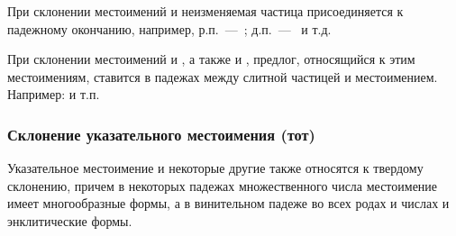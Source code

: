 \documentclass[11pt,a4paper,oneside]{memoir}
\begin{document}
    При склонении местоимений {} и {} неизменяемая частица {} присоединяется к падежному окончанию, например, р.п.~---~{}; д.п.~---~{} и т.д.
    
    При склонении местоимений {} и {}, а также {} и {}, предлог, относящийся к этим местоимениям, ставится в падежах между слитной частицей {} и местоимением. Например: {} и т.п.
    \pagebreak
    
                \subsubsection{Склонение указательного местоимения {} (тот)}

    Указательное местоимение {} и некоторые другие также относятся к твердому склонению, причем в некоторых падежах множественного числа местоимение {} имеет многообразные формы, а в винительном падеже во всех родах и числах и энклитические формы.
\end{document}
